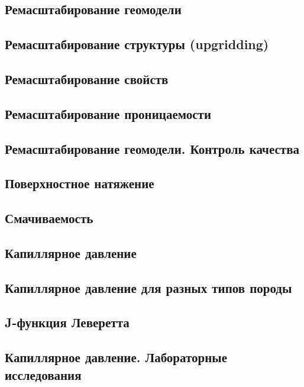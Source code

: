 \documentclass[main.tex]{subfiles}
\begin{document}
\subsection{Ремасштабирование геомодели}

\subsection{Ремасштабирование структуры (upgridding)}

\subsection{Ремасштабирование свойств}

\subsection{Ремасштабирование проницаемости}

\subsection{Ремасштабирование геомодели. Контроль качества}

\subsection{Поверхностное натяжение}

\subsection{Смачиваемость}

\subsection{Капиллярное давление}

\subsection{Капиллярное давление для разных типов породы}

\subsection{J-функция Леверетта}

\subsection{Капиллярное давление. Лабораторные исследования}
\end{document}
